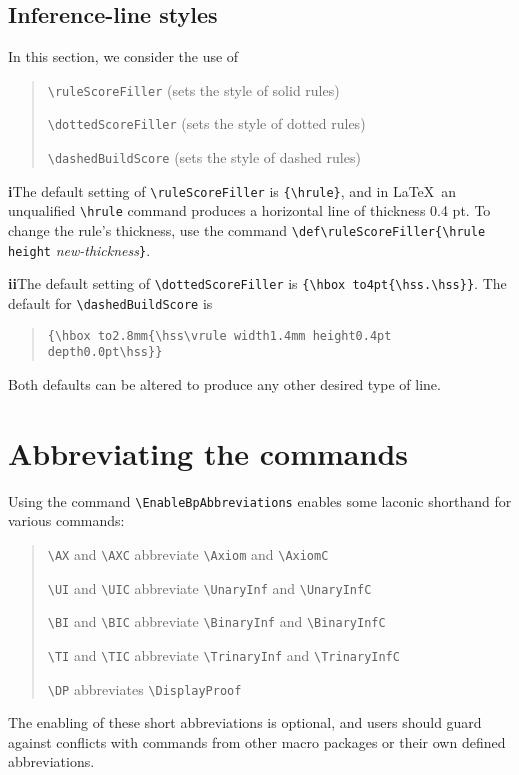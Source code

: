 \documentclass[11pt]{article}
\begin{document}
\subsection{Inference-line styles}

In this section, we consider the use of

\begin{quote}
\begin{description}\setlength{\itemsep}{0.0in}
\item   \verb=\ruleScoreFiller= (sets the style of solid rules)
\item   \verb=\dottedScoreFiller= (sets the style of dotted rules)
\item   \verb=\dashedBuildScore= (sets the style of dashed rules)
\end{description}
\end{quote}
\noindent\textbf{i}\quad The default setting of \verb=\ruleScoreFiller= is \verb={\hrule}=, and in \LaTeX\ an unqualified \verb=\hrule= command produces a horizontal line of thickness 0.4 pt. To change the rule's thickness, use the command \verb=\def\ruleScoreFiller{\hrule height= \emph{new-thickness}\verb=}=.

\vspace{12pt}
\noindent\textbf{ii}\quad The default setting of \verb=\dottedScoreFiller= is \verb={\hbox to4pt{\hss.\hss}}=. The default for \verb=\dashedBuildScore= is \begin{quote}
\verb={\hbox to2.8mm{\hss\vrule width1.4mm height0.4pt depth0.0pt\hss}}=
\end{quote} Both defaults can be altered to produce any other desired type of line.
 
\section{Abbreviating the commands}\label{abbrev}
Using the command \verb=\EnableBpAbbreviations= enables some laconic shorthand for various commands:
\begin{quote}
\begin{description}\setlength{\itemsep}{0.0in}
\item   \verb=\AX= and \verb=\AXC= abbreviate \verb=\Axiom= and \verb=\AxiomC=
\item   \verb=\UI= and \verb=\UIC= abbreviate \verb=\UnaryInf= and \verb=\UnaryInfC=
\item   \verb=\BI= and \verb=\BIC= abbreviate \verb=\BinaryInf= and \verb=\BinaryInfC=
\item   \verb=\TI= and \verb=\TIC= abbreviate \verb=\TrinaryInf= and \verb=\TrinaryInfC=
\item   \verb=\DP= abbreviates \verb=\DisplayProof=
\end{description}
\end{quote}
The enabling of these short abbreviations is optional, and users should guard against conflicts with commands  from other
macro packages or their own defined abbreviations.
\end{document}
